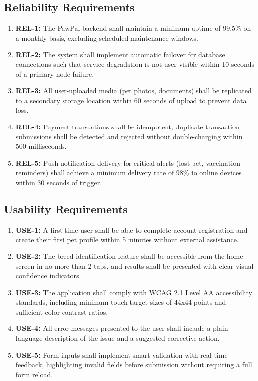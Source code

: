 \subsection{Reliability Requirements}
\begin{enumerate}
    \item \textbf{REL-1:} The PawPal backend shall maintain a minimum uptime of 99.5\% on a monthly basis, excluding scheduled maintenance windows.
    \item \textbf{REL-2:} The system shall implement automatic failover for database connections such that service degradation is not user-visible within 10 seconds of a primary node failure.
    \item \textbf{REL-3:} All user-uploaded media (pet photos, documents) shall be replicated to a secondary storage location within 60 seconds of upload to prevent data loss.
    \item \textbf{REL-4:} Payment transactions shall be idempotent; duplicate transaction submissions shall be detected and rejected without double-charging within 500 milliseconds.
    \item \textbf{REL-5:} Push notification delivery for critical alerts (lost pet, vaccination reminders) shall achieve a minimum delivery rate of 98\% to online devices within 30 seconds of trigger.
\end{enumerate}

\subsection{Usability Requirements}
\begin{enumerate}
    \item \textbf{USE-1:} A first-time user shall be able to complete account registration and create their first pet profile within 5 minutes without external assistance.
    \item \textbf{USE-2:} The breed identification feature shall be accessible from the home screen in no more than 2 taps, and results shall be presented with clear visual confidence indicators.
    \item \textbf{USE-3:} The application shall comply with WCAG 2.1 Level AA accessibility standards, including minimum touch target sizes of 44x44 points and sufficient color contrast ratios.
    \item \textbf{USE-4:} All error messages presented to the user shall include a plain-language description of the issue and a suggested corrective action.
    \item \textbf{USE-5:} Form inputs shall implement smart validation with real-time feedback, highlighting invalid fields before submission without requiring a full form reload.
\end{enumerate}

